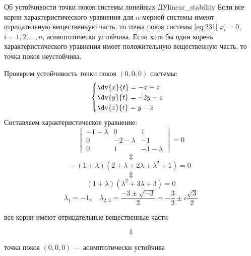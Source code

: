 \begin{theorem}{Об устойчивости точки покоя системы линейных ДУ}{linear_stability}
	Если все корни характеристического уравнения для $n$-мерной системы имеют отрицательную вещественную часть, то точка покоя системы \eqref{eq:231} $x_i = 0$, $i=1,2,\dots,n$, асимптотически устойчива. Если хотя бы один корень характеристического уравнения имеет положительную вещественную часть, то точка покоя неустойчива.
\end{theorem}

\begin{example}
	Проверим устойчивость точки покоя $(0,0,0)$ системы:
	\begin{equation*}
		\begin{cases}
			\dv{x}{t} = -x + z \\
			\dv{y}{t} = -2y - z \\
			\dv{z}{t} = y - z
		\end{cases}
	\end{equation*}
	Составляем характеристическое уравнение:
	\begin{equation*}
		\begin{vmatrix} 
			-1-\lambda & 0 & 1 \\ 
			0 & -2-\lambda & -1 \\ 
			0 & 1 & -1-\lambda 
		\end{vmatrix} = 0
	\end{equation*}
	\begin{equation*}
		\Updownarrow
	\end{equation*}
	\begin{equation*}
		-(1+\lambda)(2+\lambda+2\lambda+\lambda^2+1) = 0
	\end{equation*}
	\begin{equation*}
		\Updownarrow
	\end{equation*}
	\begin{equation*}
		(1+\lambda)(\lambda^2+3\lambda+3) = 0
	\end{equation*}
	\begin{equation*}
		\lambda_1 = -1, \quad \lambda_{2,3} = \frac{-3 \pm \sqrt{-3}}{2} = -\frac{3}{2} \pm i\frac{\sqrt{3}}{2}
	\end{equation*}
	\begin{center}
		все корни имеют отрицательные вещественные части
	\end{center}
	\begin{equation*}
		\Downarrow
	\end{equation*}
	\begin{center}
		точка покоя $(0,0,0)$ --- асимптотически устойчива
	\end{center}
\end{example}

